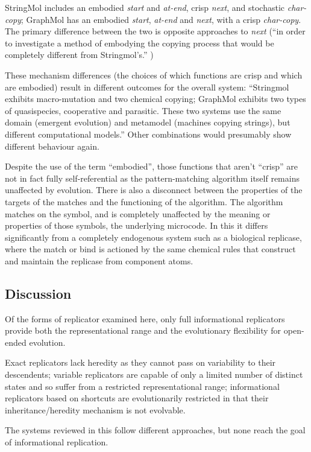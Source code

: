 StringMol includes an embodied \emph{start} and \emph{at-end}, crisp \emph{next}, and stochastic \emph{char-copy}; GraphMol has an embodied \emph{start}, \emph{at-end} and \emph{next}, with a crisp \emph{char-copy}. The primary difference between the two is opposite approaches to \emph{next} (``in order to investigate a method of embodying the copying process that would be completely different from Stringmol's.'' \parencite[p.145]{Nellis2012})

These mechanism differences (the choices of which functions are crisp and which are embodied) result in different outcomes for the overall system: ``Stringmol exhibits macro-mutation and two chemical copying; GraphMol exhibits two types of quasispecies, cooperative and parasitic. These two systems use the same domain (emergent evolution) and metamodel (machines copying strings), but different computational models.'' Other combinations would presumably show different behaviour again.

Despite the use of the term ``embodied'', those functions that aren't ``crisp'' are not in fact fully self-referential as the pattern-matching algorithm itself remains unaffected by evolution. There is also a disconnect between the properties of the targets of the matches and the functioning of the algorithm. The algorithm matches on the symbol, and is completely unaffected by the meaning or properties of those symbols, the underlying microcode. In this it differs significantly from a completely endogenous system such as a biological replicase, where the match or bind is actioned by the same chemical rules that construct and maintain the replicase from component atoms.

\subsection{Discussion}

Of the forms of replicator examined here, only full informational replicators provide both the representational range and the evolutionary flexibility for open-ended evolution. 

Exact replicators lack heredity as they cannot pass on variability to their descendents; variable replicators are capable of only a limited number of distinct states and so suffer from a restricted representational range; informational replicators based on shortcuts are evolutionarily restricted in that their inheritance/heredity mechanism is not evolvable. 

The systems reviewed in this  follow different approaches, but none reach the goal of informational replication. 

